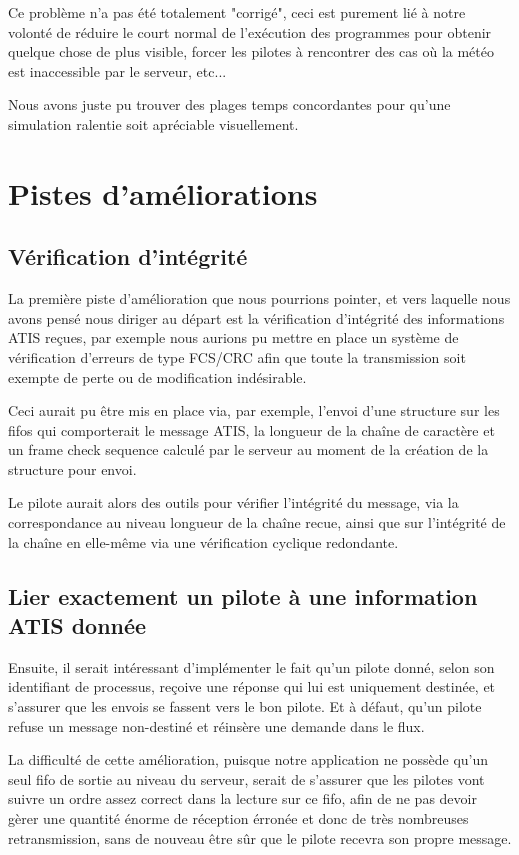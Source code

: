 \documentclass{report}
\begin{document}
{			Ce problème n'a pas été totalement "corrigé", ceci est purement lié à notre volonté de réduire le court normal de l'exécution des programmes pour obtenir quelque chose de plus visible, forcer les pilotes à rencontrer des cas où la météo est inaccessible par le serveur, etc...

			Nous avons juste pu trouver des plages temps concordantes pour qu'une simulation ralentie soit apréciable visuellement.

	\section{Pistes d'améliorations}

		\subsection{Vérification d'intégrité}

			La première piste d'amélioration que nous pourrions pointer, et vers laquelle nous avons pensé nous diriger au départ est la vérification 
			d'intégrité des informations ATIS reçues, par exemple nous aurions pu mettre en place un système de vérification d'erreurs de type FCS/CRC
			afin que toute la transmission soit exempte de perte ou de modification indésirable.

			Ceci aurait pu être mis en place via, par exemple, l'envoi d'une structure sur les fifos qui comporterait le message ATIS, la longueur de la chaîne de caractère et un frame check sequence calculé par le serveur au moment de la création de la structure pour envoi.

			Le pilote aurait alors des outils pour vérifier l'intégrité du message, via la correspondance au niveau longueur de la chaîne recue, ainsi que sur l'intégrité de la chaîne en elle-même via une vérification cyclique redondante.
			
		\subsection{Lier exactement un pilote à une information ATIS donnée}

			Ensuite, il serait intéressant d'implémenter le fait qu'un pilote donné, selon son identifiant de processus, reçoive une réponse qui lui est uniquement destinée, et s'assurer que les envois se fassent vers le bon pilote. Et à défaut, qu'un pilote refuse un message non-destiné et réinsère une demande dans le flux.

			La difficulté de cette amélioration, puisque notre application ne possède qu'un seul fifo de sortie au niveau du serveur, serait de s'assurer que les pilotes vont suivre un ordre assez correct dans la lecture sur ce fifo, afin de ne pas devoir gèrer une quantité énorme de réception érronée et donc de très nombreuses retransmission, sans de nouveau être sûr que le pilote recevra son propre message.

}
\end{document}
